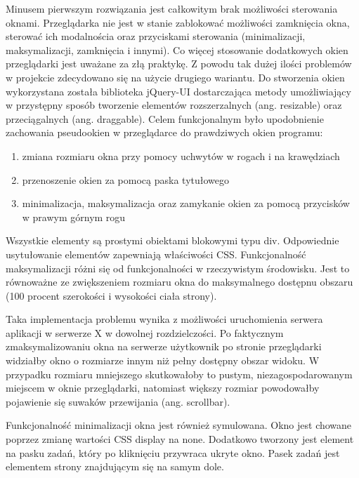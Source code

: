 Minusem pierwszym rozwiązania jest całkowitym brak możliwości sterowania oknami. Przeglądarka nie jest w stanie zablokować możliwości zamknięcia okna, sterować ich modalnościa oraz przyciskami sterowania (minimalizacji, maksymalizacji, zamknięcia i innymi). Co więcej stosowanie dodatkowych okien przeglądarki jest uważane za złą praktykę.
Z powodu tak dużej ilości problemów w projekcie zdecydowano się na użycie drugiego wariantu. Do stworzenia okien wykorzystana została biblioteka jQuery-UI dostarczająca metody umożliwiający w przystępny sposób tworzenie elementów rozszerzalnych (ang. resizable) oraz przeciągalnych (ang. draggable). Celem funkcjonalnym było upodobnienie zachowania pseudookien w przeglądarce do prawdziwych okien programu:
\begin{enumerate}
  \item zmiana rozmiaru okna przy pomocy uchwytów w rogach i na krawędziach
  \item przenoszenie okien za pomocą paska tytułowego
  \item minimalizacja, maksymalizacja oraz zamykanie okien za pomocą przycisków w prawym górnym rogu
\end{enumerate}


Wszystkie elementy są prostymi obiektami blokowymi typu div. Odpowiednie usytułowanie elementów zapewniają właściwości CSS.
Funkcjonalność maksymalizacji różni się od funkcjonalności w rzeczywistym środowisku. Jest to równoważne ze zwiększeniem rozmiaru okna do maksymalnego dostępnu obszaru (100 procent szerokości i wysokości ciała strony).

Taka implementacja problemu wynika z możliwości uruchomienia serwera aplikacji w serwerze X w dowolnej rozdzielczości. Po faktycznym zmaksymalizowaniu okna na serwerze użytkownik po stronie przeglądarki widziałby okno o rozmiarze innym niż pełny dostępny obszar widoku. W przypadku rozmiaru mniejszego skutkowałoby to pustym, niezagospodarowanym miejscem w oknie przeglądarki, natomiast większy rozmiar powodowałby pojawienie się suwaków przewijania (ang. scrollbar).

Funkcjonalność minimalizacji okna jest również symulowana. Okno jest chowane poprzez zmianę wartości CSS display na none. Dodatkowo tworzony jest element na pasku zadań, który po kliknięciu przywraca ukryte okno. Pasek zadań jest elementem strony znajdującym się na samym dole.

